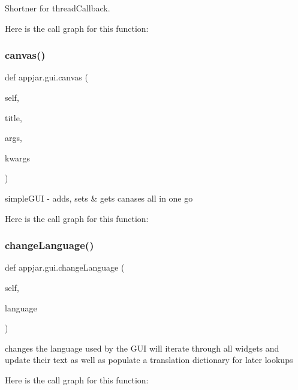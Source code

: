 \begin{DoxyVerb}Shortner for threadCallback.\end{DoxyVerb}
 Here is the call graph for this function\+:
\mbox{\label{classappjar_1_1gui_a565e4061199183dac66e25daf55d4e2c}} 
\subsubsection{\texorpdfstring{canvas()}{canvas()}}
{\footnotesize\ttfamily def appjar.\+gui.\+canvas (\begin{DoxyParamCaption}\item[{}]{self,  }\item[{}]{title,  }\item[{}]{args,  }\item[{}]{kwargs }\end{DoxyParamCaption})}

\begin{DoxyVerb}simpleGUI - adds, sets & gets canases all in one go \end{DoxyVerb}
 Here is the call graph for this function\+:
\mbox{\label{classappjar_1_1gui_a86a7b45923f8da9000c07ff501899613}} 
\subsubsection{\texorpdfstring{change\+Language()}{changeLanguage()}}
{\footnotesize\ttfamily def appjar.\+gui.\+change\+Language (\begin{DoxyParamCaption}\item[{}]{self,  }\item[{}]{language }\end{DoxyParamCaption})}

\begin{DoxyVerb}changes the language used by the GUI
    will iterate through all widgets and update their text
    as well as populate a translation dictionary for later lookups \end{DoxyVerb}
 Here is the call graph for this function\+:
\mbox{\label{classappjar_1_1gui_a974171d577bb5819246fb5c15c1e4fa8}} 
